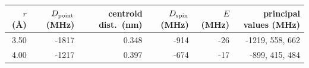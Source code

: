 \begin{tabular}{rrrrrr}
\toprule
$r$ (\AA) & $D_{\rm point}$ (MHz) & centroid dist.\ (nm) & $D_{\rm spin}$ (MHz) & $E$ (MHz) & principal values (MHz) \\
\midrule
3.50 & -1817 & 0.348 & -914 & -26 & -1219, 558, 662 \\
4.00 & -1217 & 0.397 & -674 & -17 & -899, 415, 484 \\
\bottomrule
\end{tabular}
